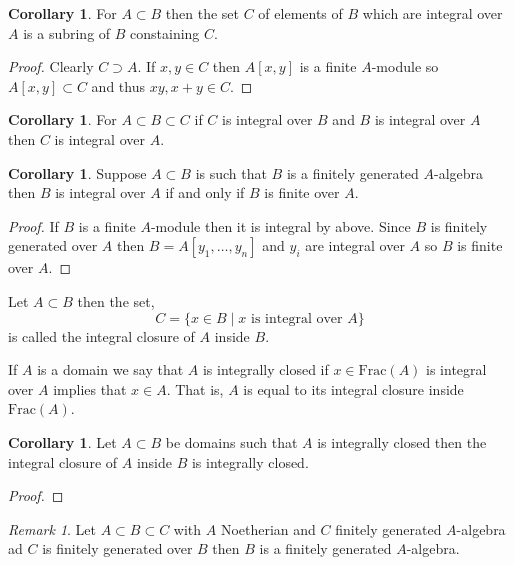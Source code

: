 \documentclass[12pt]{article}
\newcommand{\Frac}[1]{\mathrm{Frac}\left(#1\right)}
\theoremstyle{remark}
\newtheorem*{remark}{Remark}
\theoremstyle{definition}
\newtheorem{corollary}[theorem]{Corollary}
\newenvironment{definition}[1][Definition:]{\begin{trivlist}
\item[\hskip \labelsep {\bfseries #1}]}{\end{trivlist}}
\begin{document}
\begin{corollary}
For $A \subset B$ then the set $C$ of elements of $B$ which are integral over $A$ is a subring of $B$ constaining $C$.
\end{corollary}

\begin{proof}
Clearly $C \supset A$. If $x, y \in C$ then $A[x,y]$ is a finite $A$-module so $A[x,y] \subset C$ and thus $xy, x + y \in C$. 
\end{proof}

\begin{corollary}
For $A \subset B \subset C$ if $C$ is integral over $B$ and $B$ is integral over $A$ then $C$ is integral over $A$. 
\end{corollary}

\begin{corollary}
Suppose $A \subset B$ is such that $B$ is a finitely generated $A$-algebra then $B$ is integral over $A$ if and only if $B$ is finite over $A$. 
\end{corollary}

\begin{proof}
If $B$ is a finite $A$-module then it is integral by above. Since $B$ is finitely generated over $A$ then $B = A[y_1, \dots, y_n]$ and $y_i$ are integral over $A$ so $B$ is finite over $A$. 
\end{proof}

\begin{definition}
Let $A \subset B$ then the set,
\[ C = \{ x \in B \mid x \text{ is integral over } A\} \]
is called the integral closure of $A$ inside $B$.
\end{definition}

\begin{definition}
If $A$ is a domain we say that $A$ is integrally closed if $x \in \Frac{A}$ is integral over $A$ implies that $x \in A$. That is, $A$ is equal to its integral closure inside $\Frac{A}$. 
\end{definition}

\begin{corollary}
Let $A \subset B$ be domains such that $A$ is integrally closed then the integral closure of $A$ inside $B$ is integrally closed.
\end{corollary}

\begin{proof}

\end{proof}

\begin{remark}
Let $A \subset B \subset C$ with $A$ Noetherian and $C$ finitely generated $A$-algebra ad $C$ is finitely generated over $B$ then $B$ is a finitely generated $A$-algebra. 
\end{remark}
\end{document}
